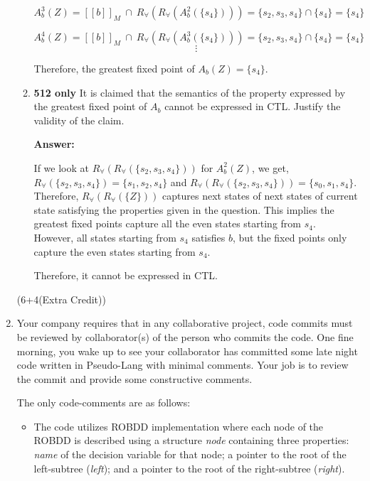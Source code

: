 \documentclass[11pt]{article}
\newcommand{\sem}[1]{[\!\![#1]\!\!]}
\begin{document}
\begin{enumerate}
\begin{enumerate}
\[ A^3_{b}(Z) = \sem{b}_M \ \cap\ R_{\forall}(R_{\forall}(A^2_{b}(\{ s_4\})))  = \{ s_2, s_3, s_4\} \cap \{s_4\}  = \{ s_4\}\]

\[ A^4_{b}(Z) = \sem{b}_M \ \cap\ R_{\forall}(R_{\forall}(A^3_{b}(\{s_4\})))  = \{ s_2, s_3, s_4\} \cap \{ s_4\}  = \{ s_4\}\]
\[ \vdots \]

Therefore, the greatest fixed point of $A_{b}(Z) =  \{ s_4\}$. 


 
 \item \textbf{512 only} It is claimed that the semantics
   of the property expressed by the greatest fixed point of
   $A_{b}$ cannot be expressed in CTL. Justify the validity of
   the claim.
   
\textbf{Answer:} 

If we look at $R_{\forall}(R_{\forall}(\{ s_2, s_3, s_4\}))$ for $A^2_{b}(Z)$, we get, $R_{\forall}(\{ s_2, s_3, s_4\}) = \{ s_1, s_2, s_4\}$ and $R_{\forall}(R_{\forall}(\{ s_2, s_3, s_4\})) = \{ s_0, s_1, s_4\}$. Therefore, $R_{\forall}(R_{\forall}(\{Z\}))$ captures next states of next states of current state satisfying the properties given in the question. This implies the greatest fixed points capture all the even states starting from $s_4$. However, all states starting from $s_4$ satisfies $b$, but the fixed points only capture the even states starting from $s_4$. 

Therefore, it cannot be expressed in CTL. 
   
 \end{enumerate}
\hfill (6+4(Extra Credit))
 

\item
  Your company requires that in any collaborative project, code commits
  must be reviewed by collaborator(s) of the person who commits the
  code.  One fine morning, you wake up to see your collaborator has
  committed some late night code written in Pseudo-Lang with minimal
  comments. Your job is to review the commit and provide some
  constructive comments.

  The only code-comments are as follows:
  \begin{itemize}
  \item The code utilizes ROBDD implementation where each node of the
    ROBDD is described using a structure \emph{node} containing three
    properties: \emph{name} of the decision variable for that node;
    a pointer to the root of the left-subtree (\emph{left}); and
    a pointer to the root of the right-subtree (\emph{right}).


\end{itemize}
\end{enumerate}
\end{document}
